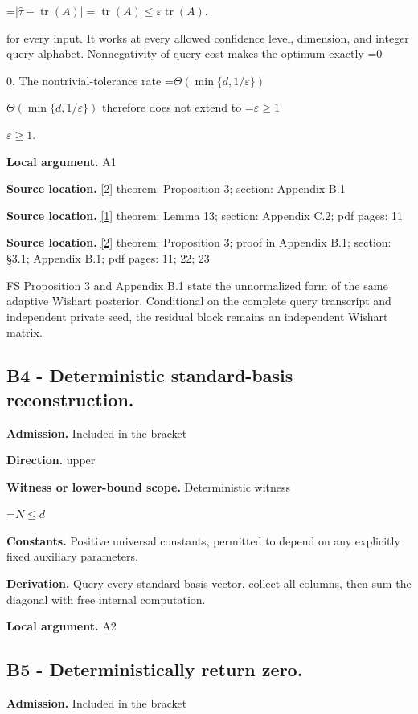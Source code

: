 \documentclass[10pt,a4paper]{article}
\newcommand{\AtlasMath}[1]{\par\begingroup\centering\setbox0=\hbox{$\displaystyle #1$}\ifdim\wd0>1.4\linewidth\typeout{ATLAS WIDE FORMULA: \the\wd0}\fi\ifdim\wd0>\linewidth\resizebox{\linewidth}{!}{\box0}\else\box0\fi\par\endgroup}
\newcommand{\AtlasInlineMath}[1]{\begingroup\setbox0=\hbox{$#1$}\ifdim\wd0>.4\linewidth\endgroup\AtlasMath{#1}\else\endgroup$#1$\fi}
\begin{document}
\AtlasMath{|\widehat\tau-\operatorname{tr}(A)|=\operatorname{tr}(A)\le\varepsilon\operatorname{tr}(A).}

for every input. It works at every allowed confidence level, dimension, and integer query alphabet. Nonnegativity of query cost makes the optimum exactly \AtlasInlineMath{0}. The nontrivial-tolerance rate \AtlasInlineMath{\Theta(\min\{d,1/\varepsilon\})} therefore does not extend to \AtlasInlineMath{\varepsilon\ge1}.

\textbf{Local argument.} A1

\textbf{Source location.} \href{https://arxiv.org/pdf/2402.09379v3}{[2]} theorem: Proposition 3; section: Appendix B.1

\textbf{Source location.} \href{https://proceedings.mlr.press/v125/braverman20a/braverman20a.pdf}{[1]} theorem: Lemma 13; section: Appendix C.2; pdf pages: 11

\textbf{Source location.} \href{https://arxiv.org/pdf/2402.09379v3}{[2]} theorem: Proposition 3; proof in Appendix B.1; section: §3.1; Appendix B.1; pdf pages: 11; 22; 23

FS Proposition 3 and Appendix B.1 state the unnormalized form of the same adaptive Wishart posterior. Conditional on the complete query transcript and independent private seed, the residual block remains an independent Wishart matrix.

\subsection{B4 - Deterministic standard-basis reconstruction.}
\textbf{Admission.} Included in the bracket

\textbf{Direction.} upper

\textbf{Witness or lower-bound scope.} Deterministic witness

\AtlasMath{N\le d}
\textbf{Constants.} Positive universal constants, permitted to depend on any explicitly fixed auxiliary parameters.

\textbf{Derivation.} Query every standard basis vector, collect all columns, then sum the diagonal with free internal computation.

\textbf{Local argument.} A2

\subsection{B5 - Deterministically return zero.}
\textbf{Admission.} Included in the bracket
\end{document}
